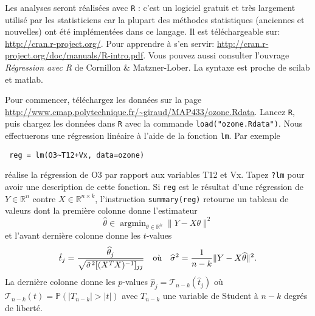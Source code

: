\documentclass[a4paper,11pt,fleqn]{article}
\newcommand{\R}{\ensuremath{\mathbb{R}}}
\newcommand{\1}{\ensuremath{\mathbbm{1}}}
\newcommand{\p}{\ensuremath{\mathbb{P}}}
\begin{document}
Les analyses seront r\'ealis\'ees avec  {\tt R} : c'est un logiciel gratuit et tr\`es largement utilis\'e par les statisticiens car la plupart des m\'ethodes statistiques (anciennes et nouvelles) ont \'et\'e impl\'ement\'ees dans ce langage. Il est
t\'el\'echargeable sur: \url{http://cran.r-project.org/}.
 Pour apprendre \`a s'en servir:  \url{http://cran.r-project.org/doc/manuals/R-intro.pdf}. Vous pouvez aussi consulter l'ouvrage
 \emph{R\'egression avec R} de Cornillon \& Matzner-Lober. La syntaxe est proche de scilab et matlab. \medskip

 Pour commencer, t\'el\'echargez les donn\'ees sur la page \url{http://www.cmap.polytechnique.fr/~giraud/MAP433/ozone.Rdata}. Lancez {\tt R}, puis chargez les donn\'ees dans {\tt R} avec la commande {\tt load("ozone.Rdata")}. Nous effectuerons une r\'egression lin\'eaire \`a l'aide de la fonction {\tt lm}. Par exemple
 \begin{verbatim}
 reg = lm(O3~T12+Vx, data=ozone)
 \end{verbatim}
 r\'ealise la r\'egression de O3 par rapport aux variables T12 et Vx.
 Tapez {\tt ?lm} pour avoir une description de cette fonction.
 Si {\tt reg} est le r\'esultat d'une r\'egression de $Y\in\R^n$ contre $X\in\R^{n\times k}$, l'instruction {\tt summary(reg)} retourne un tableau de valeurs dont la premi\`ere  colonne donne l'estimateur
 $$\widehat \theta\in\mathop{\textrm{argmin}}_{\theta\in\R^k}\|Y-X \theta\|^2$$
 et l'avant derni\`ere colonne donne les $t$-values
$$\hat t_{j}={\widehat\theta_{j}\over \sqrt{\hat \sigma^2[(X^TX)^{-1}]_{jj}}}\quad\textrm{o\`u}\quad \widehat \sigma^2={1\over n-k}\|Y-X\widehat\theta\|^2.$$
 La derni\`ere colonne donne les $p$-values $\hat p_{j}= \mathcal{T}_{n-k}(\hat t_{j})$ o\`u $\mathcal{T}_{n-k}(t)=\p(|T_{n-k}|>|t|)$  avec $T_{n-k}$ une variable de Student \`a $n-k$ degr\'es de libert\'e.
\end{document}
